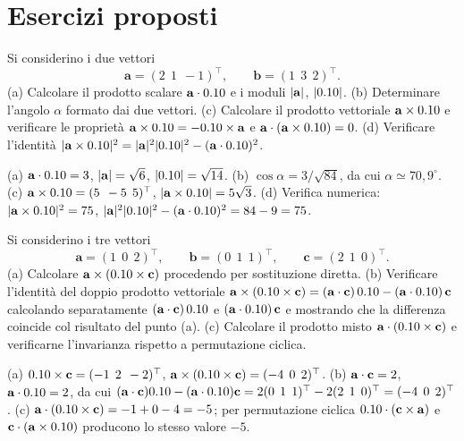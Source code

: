 \section{Esercizi proposti}

\begin{esercizio}
	\label{ex:A03_prodotti}
	
	Si considerino i due vettori
	\begin{equation*}
		\bm{a} = (2\;\,1\;\,-1)^\top, \qquad
		\bm{b} = (1\;\,3\;\,2)^\top.
	\end{equation*}
	(a) Calcolare il prodotto scalare $\mathbf{a} \cdot 0.10$ e i moduli $|\mathbf{a}|$, $|0.10|$.
	(b) Determinare l'angolo $\alpha$ formato dai due vettori.
	(c) Calcolare il prodotto vettoriale $\mathbf{a} \times 0.10$ e verificare le proprietà $\mathbf{a} \times 0.10 = -0.10 \times \mathbf{a}$ e $\mathbf{a} \cdot (\mathbf{a} \times 0.10) = 0$.
	(d) Verificare l'identità $|\mathbf{a} \times 0.10|^2 = |\mathbf{a}|^2 |0.10|^2 - (\mathbf{a} \cdot 0.10)^2$.
	
	\risultato (a) $\mathbf{a} \cdot 0.10 = 3$, $|\mathbf{a}| = \sqrt{6}$, $|0.10| = \sqrt{14}$. (b) $\cos\alpha = 3/\sqrt{84}$, da cui $\alpha \simeq 70{,}9^\circ$. (c) $\mathbf{a} \times 0.10 = (5\;\,-5\;\,5)^\top$, $|\mathbf{a} \times 0.10| = 5\sqrt{3}$. (d) Verifica numerica: $|\mathbf{a} \times 0.10|^2 = 75$, $|\mathbf{a}|^2 |0.10|^2 - (\mathbf{a} \cdot 0.10)^2 = 84 - 9 = 75$.
	
\end{esercizio}

\begin{esercizio}
	\label{ex:A03_doppio_prodotto}
	
	Si considerino i tre vettori
	\begin{equation*}
		\bm{a} = (1\;\,0\;\,2)^\top, \qquad
		\bm{b} = (0\;\,1\;\,1)^\top, \qquad
		\bm{c}= (2\;\,1\;\,0)^\top.
	\end{equation*}
	(a) Calcolare $\mathbf{a} \times (0.10 \times \mathbf{c})$ procedendo per sostituzione diretta.
	(b) Verificare l'identità del doppio prodotto vettoriale $\mathbf{a} \times (0.10 \times \mathbf{c}) = (\mathbf{a} \cdot \mathbf{c}) \, 0.10 - (\mathbf{a} \cdot 0.10) \, \mathbf{c}$ calcolando separatamente $(\mathbf{a} \cdot \mathbf{c}) \, 0.10$ e $(\mathbf{a} \cdot 0.10) \, \mathbf{c}$ e mostrando che la differenza coincide col risultato del punto (a).
	(c) Calcolare il prodotto misto $\mathbf{a} \cdot (0.10 \times \mathbf{c})$ e verificarne l'invarianza rispetto a permutazione ciclica.
	
	\risultato (a) $0.10 \times \mathbf{c} = (-1\;\,2\;\,-2)^\top$, $\mathbf{a} \times (0.10 \times \mathbf{c}) = (-4\;\,0\;\,2)^\top$. (b) $\mathbf{a} \cdot \mathbf{c} = 2$, $\mathbf{a} \cdot 0.10 = 2$, da cui $(\mathbf{a} \cdot \mathbf{c}) 0.10 - (\mathbf{a} \cdot 0.10) \mathbf{c} = 2(0\;\,1\;\,1)^\top - 2(2\;\,1\;\,0)^\top = (-4\;\,0\;\,2)^\top$. (c) $\mathbf{a} \cdot (0.10 \times \mathbf{c}) = -1 + 0 - 4 = -5$; per permutazione ciclica $0.10 \cdot (\mathbf{c} \times \mathbf{a})$ e $\mathbf{c} \cdot (\mathbf{a} \times 0.10)$ producono lo stesso valore $-5$.
	
\end{esercizio}


